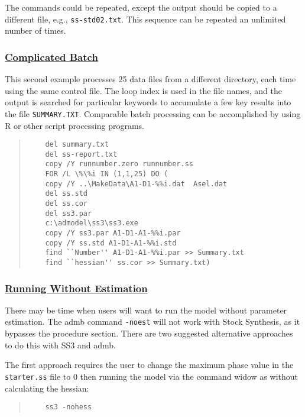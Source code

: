 The commands could be repeated, except the output should be copied to a different file, e.g., \texttt{ss-std02.txt}. This sequence can be repeated an unlimited number of times.

\hypertarget{ComplexBatch}{}
\subsubsection[Complicated Batch]{\protect\hyperlink{ComplexBatch}{Complicated Batch}}
This second example processes 25 data files from a different directory, each time using the same control file. The loop index is used in the file names, and the output is searched for particular keywords to accumulate a few key results into the file \texttt{SUMMARY.TXT}. Comparable batch processing can be accomplished by using R or other script processing programs.

\begin{quote}
	\begin{verbatim}
	del summary.txt
	del ss-report.txt
	copy /Y runnumber.zero runnumber.ss
	FOR /L \%\%i IN (1,1,25) DO (
	copy /Y ..\MakeData\A1-D1-%%i.dat  Asel.dat
	del ss.std
	del ss.cor
	del ss3.par
	c:\admodel\ss3\ss3.exe
	copy /Y ss3.par A1-D1-A1-%%i.par
	copy /Y ss.std A1-D1-A1-%%i.std
	find ``Number'' A1-D1-A1-%%i.par >> Summary.txt
	find ``hessian'' ss.cor >> Summary.txt)
	\end{verbatim}
\end{quote}


\hypertarget{NoEst}{}
\subsubsection[Running Without Estimation]{\protect\hyperlink{NoEst}{Running Without Estimation}}
There may be time when users will want to run the model without parameter estimation. The \gls{admb} command \texttt{-noest} will not work with Stock Synthesis, as it bypasses the procedure section. There are two suggested alternative approaches to do this with SS3 and \gls{admb}.  

The first approach requires the user to change the maximum phase value in the \texttt{starter.ss} file to 0 then running the model via the command widow as without calculating the hessian:

\begin{quote}
	\begin{verbatim}
	ss3 -nohess
	\end{verbatim}
\end{quote}

